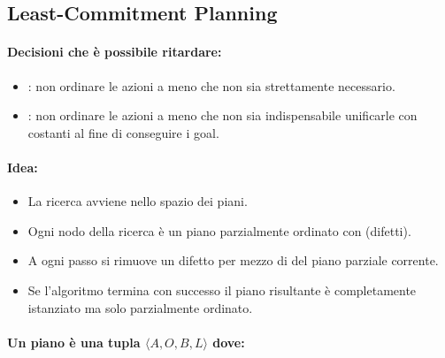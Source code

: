 \subsection{Least-Commitment Planning}


\paragraph{Decisioni che è possibile ritardare:}

\begin{itemize}
  \item {}: non ordinare le azioni a meno che non sia strettamente necessario. 
  \item {}: non ordinare le azioni a meno che non sia indispensabile unificarle con costanti al fine di conseguire i goal.
\end{itemize}

\paragraph{Idea:}

\begin{itemize}
  \item La ricerca avviene nello spazio dei piani. 
  \item Ogni nodo della ricerca è un piano parzialmente ordinato con  (difetti). 
  \item A ogni passo si rimuove un difetto per mezzo di  del piano parziale corrente. 
  \item Se l'algoritmo termina con successo il piano risultante è completamente istanziato ma solo parzialmente ordinato.
\end{itemize}


\paragraph{Un piano è una tupla $\langle A, O, B, L\rangle$ dove:}

